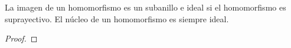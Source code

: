 \begin{thm}
    La imagen de un homomorfismo es un subanillo e ideal si el homomorfismo es suprayectivo. El núcleo de un homomorfismo es siempre ideal.
\end{thm}

\begin{proof}
    
\end{proof}
